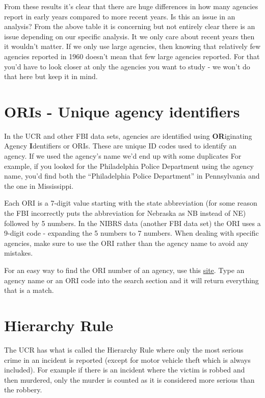 \documentclass[
  12pt,
]{book}
\begin{document}
From these results it's clear that there are huge differences in how many agencies report in early years compared to more recent years. Is this an issue in an analysis? From the above table it is concerning but not entirely clear there is an issue depending on our specific analysis. It we only care about recent years then it wouldn't matter. If we only use large agencies, then knowing that relatively few agencies reported in 1960 doesn't mean that few large agencies reported. For that you'd have to look closer at only the agencies you want to study - we won't do that here but keep it in mind.

\hypertarget{oris---unique-agency-identifiers}{%
\section{ORIs - Unique agency identifiers}\label{oris---unique-agency-identifiers}}

In the UCR and other FBI data sets, agencies are identified using \textbf{OR}iginating Agency \textbf{I}dentifiers or ORIs. These are unique ID codes used to identify an agency. If we used the agency's name we'd end up with some duplicates For example, if you looked for the Philadelphia Police Department using the agency name, you'd find both the ``Philadelphia Police Department'' in Pennsylvania and the one in Mississippi.

Each ORI is a 7-digit value starting with the state abbreviation (for some reason the FBI incorrectly puts the abbreviation for Nebraska as NB instead of NE) followed by 5 numbers. In the NIBRS data (another FBI data set) the ORI uses a 9-digit code - expanding the 5 numbers to 7 numbers. When dealing with specific agencies, make sure to use the ORI rather than the agency name to avoid any mistakes.

For an easy way to find the ORI number of an agency, use this \href{http://crimedatatool.com/crosswalk.html}{site}. Type an agency name or an ORI code into the search section and it will return everything that is a match.

\hypertarget{hierarchy-rule}{%
\section{Hierarchy Rule}\label{hierarchy-rule}}

The UCR has what is called the Hierarchy Rule where only the most serious crime in an incident is reported (except for motor vehicle theft which is always included). For example if there is an incident where the victim is robbed and then murdered, only the murder is counted as it is considered more serious than the robbery.
\end{document}

